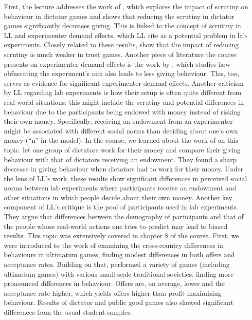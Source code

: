 \documentclass{article}
\begin{document}
First, the lecture addresses the work of \citet{Hoffman.1996}, which explores the impact of scrutiny on behaviour in dictator games and shows that reducing the scrutiny in dictator games significantly decreases giving. This is linked to the concept of scrutiny in LL and experimenter demand effects, which LL cite as a potential problem in lab experiments. Closely related to these results, \citep{Berg.1995} show that the impact of reducing scrutiny is much weaker in trust games. Another piece of literature the course presents on experimenter demand effects is the work by \citet{Bardsley.2008} , which studies how obfuscating the experiment's aim also leads to less giving behaviour. This, too, serves as evidence for significant experimenter demand effects. 
Another criticism by LL regarding lab experiments is how their setup is often quite different from real-world situations; this might include the scrutiny and potential differences in behaviour due to the participants being endowed with money instead of risking their own money. Specifically, receiving an endowment from an experimenter might be associated with different social norms than deciding about one’s own money (“n” in the model). 
In the course, we learned about the work of \citet{Cherry.2002} on this topic. \citet{Cherry.2002} let one group of dictators work for their money and compare their giving behaviour with that of dictators receiving an endowment. They found a sharp decrease in giving behaviour when dictators had to work for their money. Under the lens of LL's work, these results show significant differences in perceived social norms between lab experiments where participants receive an endowment and other situations in which people decide about their own money. 
Another key component of LL’s critique is the pool of participants used in lab experiments. They argue that differences between the demography of participants and that of the people whose real-world actions one tries to predict may lead to biased results. This topic was extensively covered in chapter 8 of the course. First, we were introduced to the work of  \citet{Roth.1991} examining the cross-country differences in behaviours in ultimatum games, finding modest differences in both offers and acceptance rates. Building on that, \citet{Henrich.2001} performed a variety of games (including ultimatum games) with various small-scale traditional societies, finding more pronounced differences in behaviour. Offers are, on average, lower and the acceptance rate higher, which yields offers higher than profit-maximizing behaviour. Results of dictator and public good games also showed significant differences from the usual student samples. 
\end{document}

